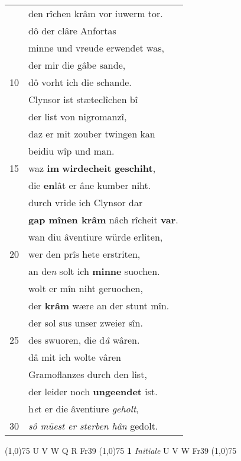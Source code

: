 \documentclass[8pt,a4paper,notitlepage]{article}
\begin{document}
\begin{table}[ht]
\begin{minipage}[t]{0.5\linewidth}
\begin{tabular}{rl}
 & den rîchen krâm vor iuwerm tor.\\ 
 & dô der clâre Anfortas\\ 
 & minne und vreude erwendet was,\\ 
 & der mir die gâbe sande,\\ 
10 & dô vorht ich die schande.\\ 
 & Clynsor ist stæteclîchen bî\\ 
 & der list von nigromanzî,\\ 
 & daz er mit zouber twingen kan\\ 
 & beidiu wîp und man.\\ 
15 & waz \textbf{im} \textbf{wirdecheit} \textbf{geschiht},\\ 
 & die \textbf{en}lât er âne kumber niht.\\ 
 & durch vride ich Clynsor dar\\ 
 & \textbf{gap mînen krâm} nâch rîcheit \textbf{var}.\\ 
 & wan diu âventiure würde erliten,\\ 
20 & wer den prîs hete erstriten,\\ 
 & an de\textit{n} solt ich \textbf{minne} suochen.\\ 
 & wolt er mîn niht geruochen,\\ 
 & der \textbf{krâm} wære an der stunt mîn.\\ 
 & der sol sus unser zweier sîn.\\ 
25 & des swuoren, die d\textit{â} wâren.\\ 
 & dâ mit ich wolte vâren\\ 
 & Gramoflanzes durch den list,\\ 
 & der leider noch \textbf{ungeendet} ist.\\ 
 & h\textit{e}t er die âventiure \textit{geholt},\\ 
30 & \textit{sô müest er sterben hân} gedolt.\\ 
\end{tabular}
\scriptsize
\line(1,0){75} \newline
U V W Q R Fr39 \newline
\line(1,0){75} \newline
\textbf{1} \textit{Initiale} U V W Fr39  \newline
\line(1,0){75} \newline

\end{minipage}
\end{table}
\end{document}
